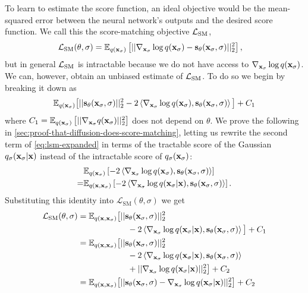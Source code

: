 To learn to estimate the score function, an ideal objective would be the mean-squared error between the neural network's outputs and the desired score function. We call this the score-matching objective ${\mathcal{L}}_\text{SM}$,
\begin{align}
    \mathcal{L}_\text{SM}(\theta, \sigma) &= \mathbb{E}_{q({\mathbf{x}}_\sigma)} \left[ || \nabla_{{\mathbf{x}}_\sigma} \log q({\mathbf{x}}_\sigma) - {\mathbf{s}}_\theta({\mathbf{x}}_\sigma, \sigma) ||_2^2 \right],
\end{align}
but in general ${\mathcal{L}}_\text{SM}$ is intractable because we do not have access to $\nabla_{{\mathbf{x}}_\sigma} \log q({\mathbf{x}}_\sigma)$. We can, however, obtain an unbiased estimate of ${\mathcal{L}}_\text{SM}$. To do so we begin by breaking it down as
\begin{align} \label{eq:lsm-expanded}
    \mathbb{E}_{q({\mathbf{x}}_\sigma)} \big[ 
    || {\mathbf{s}}_\theta({\mathbf{x}}_\sigma, \sigma) ||_2^2
    - 2 \left\langle \nabla_{{\mathbf{x}}_\sigma} \log q({\mathbf{x}}_\sigma),
    {\mathbf{s}}_\theta({\mathbf{x}}_\sigma, \sigma) \right\rangle \big]
    + C_1
\end{align}
where $C_1 = \mathbb{E}_{q({\mathbf{x}}_\sigma)} \left[ || \nabla_{{\mathbf{x}}_\sigma} q({\mathbf{x}}_\sigma) ||_2^2 \right]$ does not depend on $\theta$. We prove the following in \cref{sec:proof-that-diffusion-does-score-matching}, letting us rewrite the second term of \cref{eq:lsm-expanded} in terms of the tractable score of the Gaussian $q_{\sigma}({\mathbf{x}}_\sigma|{\mathbf{x}})$ instead of the intractable score of $q_{\sigma}({\mathbf{x}}_\sigma)$:
\begin{align}
\allowdisplaybreaks
    &\EX_{q(\rvx_\sigma)} \left[ - 2 \left\langle \nabla_{\rvx_\sigma} \log q(\rvx_\sigma), \rvs_\theta(\rvx_\sigma, \sigma) \right\rangle \right] \\
    =& \EX_{q(\rvx, \rvx_\sigma)} \left[ -2 \left\langle \nabla_{\rvx_\sigma} \log q(\rvx_\sigma|\rvx), \rvs_\theta(\rvx_\sigma, \sigma) \right\rangle  \right]. \nonumber
\end{align}
Substituting this identity into $\mathcal{L}_\text{SM}(\theta, \sigma)$ we get
\begin{align}
    \mathcal{L}_\text{SM}(\theta, \sigma) &= \mathbb{E}_{q({\mathbf{x}}, {\mathbf{x}}_\sigma)} \big[ 
    || {\mathbf{s}}_\theta({\mathbf{x}}_\sigma, \sigma) ||_2^2
    \\ &\qquad\qquad\qquad\nonumber
    - 2 \left\langle \nabla_{{\mathbf{x}}_\sigma} \log q({\mathbf{x}}_\sigma|{\mathbf{x}}), {\mathbf{s}}_\theta({\mathbf{x}}_\sigma, \sigma) \right\rangle \big] + C_1 \\
    &= \mathbb{E}_{q({\mathbf{x}}, {\mathbf{x}}_\sigma)} \big[ 
    || {\mathbf{s}}_\theta({\mathbf{x}}_\sigma, \sigma) ||_2^2
    \\ &\qquad\qquad\qquad
    - 2 \left\langle \nabla_{{\mathbf{x}}_\sigma} \log q({\mathbf{x}}_\sigma|{\mathbf{x}}), {\mathbf{s}}_\theta({\mathbf{x}}_\sigma, \sigma) \right\rangle
    \nonumber\\ &\qquad\qquad\qquad
    + || \nabla_{{\mathbf{x}}_\sigma} \log q({\mathbf{x}}_\sigma|{\mathbf{x}}) ||_2^2 \big] + C_2 \nonumber \\
    &= \mathbb{E}_{q({\mathbf{x}}, {\mathbf{x}}_\sigma)} \big[ 
    || {\mathbf{s}}_\theta({\mathbf{x}}_\sigma, \sigma) - \nabla_{{\mathbf{x}}_\sigma} \log q({\mathbf{x}}_\sigma|{\mathbf{x}}) ||_2^2 \big] + C_2
\end{align}
